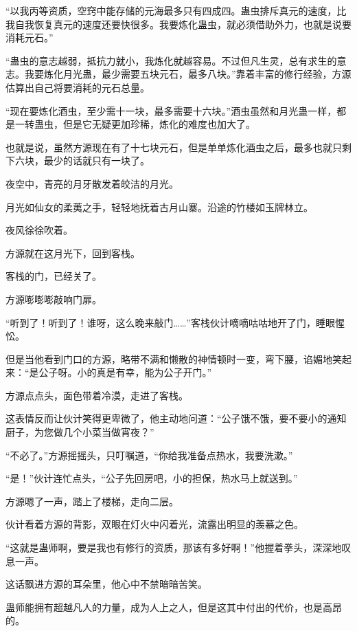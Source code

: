 
\begin{this_body}

“以我丙等资质，空窍中能存储的元海最多只有四成四。蛊虫排斥真元的速度，比我自我恢复真元的速度还要快很多。我要炼化蛊虫，就必须借助外力，也就是说要消耗元石。”

“蛊虫的意志越弱，抵抗力就小，我炼化就越容易。不过但凡生灵，总有求生的意志。我要炼化月光蛊，最少需要五块元石，最多八块。”靠着丰富的修行经验，方源估算出自己将要消耗的元石总量。

“现在要炼化酒虫，至少需十一块，最多需要十六块。”酒虫虽然和月光蛊一样，都是一转蛊虫，但是它无疑更加珍稀，炼化的难度也加大了。

也就是说，虽然方源现在有了十七块元石，但是单单炼化酒虫之后，最多也就只剩下六块，最少的话就只有一块了。

夜空中，青亮的月牙散发着皎洁的月光。

月光如仙女的柔荑之手，轻轻地抚着古月山寨。沿途的竹楼如玉牌林立。

夜风徐徐吹着。

方源就在这月光下，回到客栈。

客栈的门，已经关了。

方源嘭嘭嘭敲响门扉。

“听到了！听到了！谁呀，这么晚来敲门……”客栈伙计嘀嘀咕咕地开了门，睡眼惺忪。

但是当他看到门口的方源，略带不满和懒散的神情顿时一变，弯下腰，谄媚地笑起来：“是公子呀。小的真是有幸，能为公子开门。”

方源点点头，面色带着冷漠，走进了客栈。

这表情反而让伙计笑得更卑微了，他主动地问道：“公子饿不饿，要不要小的通知厨子，为您做几个小菜当做宵夜？”

“不必了。”方源摇摇头，只叮嘱道，“你给我准备点热水，我要洗漱。”

“是！”伙计连忙点头，“公子先回房吧，小的担保，热水马上就送到。”

方源嗯了一声，踏上了楼梯，走向二层。

伙计看着方源的背影，双眼在灯火中闪着光，流露出明显的羡慕之色。

“这就是蛊师啊，要是我也有修行的资质，那该有多好啊！”他握着拳头，深深地叹息一声。

这话飘进方源的耳朵里，他心中不禁暗暗苦笑。

蛊师能拥有超越凡人的力量，成为人上之人，但是这其中付出的代价，也是高昂的。


\end{this_body}
